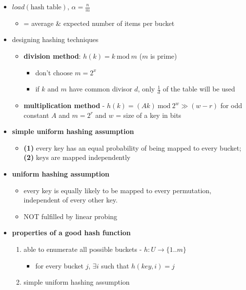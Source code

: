 \documentclass[10pt]{article}
\newcommand{\Mod}[1]{\ \mathrm{mod}\ #1}
\begin{document}
\begin{multicols}{3}
\begin{itemize}
    \item $load(\text{hash table})$, $\alpha = \frac{n}{m}$ 
    \begin{itemize}
        \item = average \& expected number of items per bucket
    \end{itemize}
    \item designing hashing techniques
    \begin{itemize}
        \item \textbf{division method}: $h(k) = k \Mod{m}$ ($m$ is prime)
        \begin{itemize}
            \item don't choose $m = 2^x$
            \item if $k$ and $m$ have common divisor $d$, only $\frac{1}{d}$ of the table will be used
        \end{itemize}
        \item \textbf{multiplication method} - $h(k) = (Ak) \Mod{2^w} \gg (w-r)$ 
        for odd constant $A$ and $m = 2^r$ and $w$ = size of a key in bits
    \end{itemize}
    \item \textbf{simple uniform hashing assumption} 
    \begin{itemize}
        \item \textbf{(1)} every key has an equal probability of being mapped to every bucket; \textbf{(2)} keys are mapped independently
    \end{itemize}
    \item \textbf{uniform hashing assumption} 
    \begin{itemize}
        \item every key is equally likely to be mapped to every permutation, independent of every other key.
        \item NOT fulfilled by linear probing
    \end{itemize}
    \item \textbf{properties of a good hash function}
    \begin{enumerate}
        \item able to enumerate all possible buckets - $h:U \to \{1..m\}$
        \begin{itemize}
            \item for every bucket $j$, $\exists i$ such that $h(key, i) = j$
        \end{itemize}
        \item simple uniform hashing assumption
    \end{enumerate}
\end{itemize}


\end{multicols}
\end{document}
